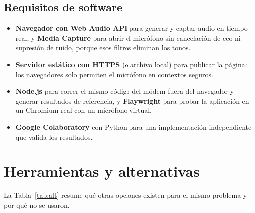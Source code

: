 \documentclass[10pt,twocolumn,letterpaper]{article}
\begin{document}
\subsection{Requisitos de software}
\begin{itemize}
\item \textbf{Navegador con Web Audio API} \cite{webaudio} para generar y captar audio en tiempo real, y \textbf{Media Capture} \cite{mediacapture} para abrir el micrófono sin cancelación de eco ni supresión de ruido, porque esos filtros eliminan los tonos.
\item \textbf{Servidor estático con HTTPS} (o archivo local) para publicar la página: los navegadores solo permiten el micrófono en contextos seguros.
\item \textbf{Node.js} para correr el mismo código del módem fuera del navegador y generar resultados de referencia, y \textbf{Playwright} para probar la aplicación en un Chromium real con un micrófono virtual.
\item \textbf{Google Colaboratory} con Python para una implementación independiente que valida los resultados.
\end{itemize}

\section{Herramientas y alternativas}
La Tabla~\ref{tab:alt} resume qué otras opciones existen para el mismo problema y por qué no se usaron.
\end{document}
